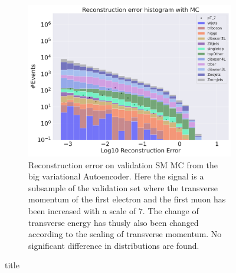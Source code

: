 \begin{figure}[h!]
\begin{subfigure}{.45\textwidth}
        \includegraphics[width=\textwidth]{Figures/AE_testing/big/b_data_recon_big_rm3_feats_sig_pT_7.pdf}
        \caption{Reconstruction error on validation SM MC from the big variational Autoencoder. Here the signal is a subsample of the validation 
        set where the transverse momentum of the first electron and the first muon has been increased with a scale of $7$. The change of transverse 
        energy has thusly also been changed according to the scaling of transverse momentum. No significant difference in distributions are found. }
        \label{fig:ae_big_pt_7}
    \end{subfigure}
    \hfill 
    \caption{title}
    \label{fig:ae_big_small_pt_7}
\end{figure}

